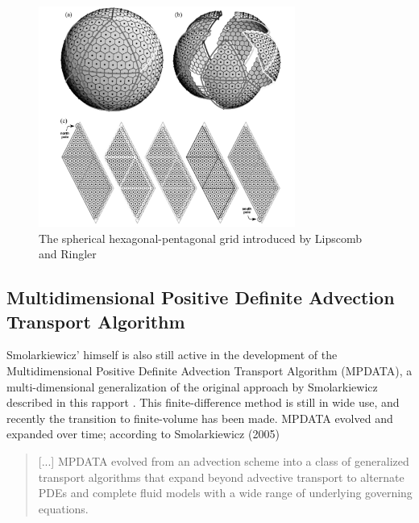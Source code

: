 \documentclass[10pt, a4paper]{article}
\newcommand{\imsize}{}
\begin{document}
\begin{figure}[htp]
\centering
\renewcommand{\imsize}{0.75\textwidth}
\includegraphics[width=\imsize]{figures/lipcomb}%
\caption{\label{fig:hexpent} The spherical hexagonal-pentagonal grid introduced by Lipscomb and Ringler \cite{lipscomb}}
\end{figure}

\subsection{Multidimensional Positive Definite Advection Transport Algorithm}
Smolarkiewicz' himself is also still active in the development of the Multidimensional Positive Definite Advection Transport Algorithm (MPDATA), a multi-dimensional generalization of the original approach by Smolarkiewicz described in this rapport \cite{mpdata}. This finite-difference method is still in wide use, and recently the transition to finite-volume has been made. MPDATA evolved and expanded over time; according to Smolarkiewicz (2005)
\begin{quotation}
[...] MPDATA evolved from an advection scheme into a class of generalized transport algorithms that expand beyond advective transport to alternate PDEs and complete fluid models with a wide range of underlying governing equations.
\end{quotation}

\clearpage
\end{document}
